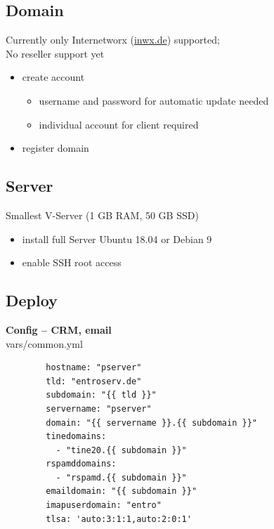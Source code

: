\documentclass{beamer}
\begin{document}
\subsection{Domain}
\begin{frame}{\insertsection}{\insertsubsection}
	\vspace{-0.5cm}
	Currently only Internetworx (\url{inwx.de}) supported;\\
	No reseller support yet 
	\begin{itemize}
		\item create account
		\begin{itemize}
			\item username and password for automatic update needed
			\item individual account for client required
		\end{itemize}
		\item register domain
	\end{itemize}
\end{frame}	

\subsection{Server}
\begin{frame}{\insertsection}{\insertsubsection}
	\vspace{-0.5cm}
	Smallest V-Server (1 GB RAM, 50 GB SSD)
	\begin{itemize}
		\item install full Server Ubuntu 18.04 or Debian 9
		\item enable SSH root access
	\end{itemize}
\end{frame}	

\subsection{Deploy}
\begin{frame}[fragile]{\insertsection}{\insertsubsection}
	\vspace{-0.5cm}
	\textbf{Config -- CRM, email}\\
	vars/common.yml
    \begin{verbatim}
		hostname: "pserver"
		tld: "entroserv.de"
		subdomain: "{{ tld }}"
		servername: "pserver"
		domain: "{{ servername }}.{{ subdomain }}"
		tinedomains:
		  - "tine20.{{ subdomain }}"
		rspamddomains:
		  - "rspamd.{{ subdomain }}"
		emaildomain: "{{ subdomain }}"
		imapuserdomain: "entro"
		tlsa: 'auto:3:1:1,auto:2:0:1'
	\end{verbatim}
\end{frame}	
\end{document}

